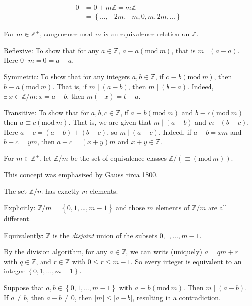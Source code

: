 \documentclass{notes}
\begin{document}
\begin{eg}
  \begin{align*}
    \overline 0 &= 0 + m \mathbb Z = m \mathbb Z \\ 
    &= \left \{ \dots, -2 m, -m, 0, m, 2 m, \dots \right \}
  \end{align*}
\end{eg}

\begin{prop}
  For $m \in \mathbb Z^+$, congruence mod $m$ is an equivalence relation on $\mathbb Z$.
\end{prop}

\begin{prf}
  Reflexive: To show that for any $a \in \mathbb Z$, $a \equiv a (\mathrm{mod}\ m)$, that is $m \mid (a - a)$.
  Here $0 \cdot m = 0 = a - a$.

  Symmetric: To show that for any integers $a, b \in \mathbb Z$, if $a \equiv b (\mathrm{mod}\ m)$, then $b \equiv a (\mathrm{mod}\ m)$.
  That is, if $m \mid (a - b)$, then $m \mid (b - a)$.
  Indeed, $\exists \, x \in \mathbb Z / m: x = a - b$, then $m (-x) = b - a$.

  Transitive: To show that for $a, b, c \in \mathbb Z$, if $a \equiv b (\mathrm{mod}\ m)$ and $b \equiv c (\mathrm{mod}\ m)$ then $a \equiv c (\mathrm{mod}\ m)$.
  That is, we are given that $m \mid (a - b)$ and $m \mid (b - c)$.
  Here $a - c = (a - b) + (b - c)$, so $m \mid (a - c)$.
  Indeed, if $a - b = x m$ and $b - c = y m$, then $a - c = (x + y) m$ and $x + y \in \mathbb Z$.
\end{prf}

\begin{defn}
  For $m \in \mathbb Z^+$, let $\mathbb Z / m$ be the set of equivalence classes $\mathbb Z / (\equiv (\mathrm{mod}\ m))$.

  This concept was emphasized by Gauss circa 1800.
\end{defn}

\begin{prop}
  The set $\mathbb Z / m$ has exactly $m$ elements.

  Explicitly: $\mathbb Z / m = \left \{ \overline 0, \overline 1, \dots, \overline{m - 1} \right \}$ and those $m$ elements of $\mathbb Z / m$ are all different.

  Equivalently: $\mathbb Z$ is the \textit{disjoint} union of the subsets $\overline 0, \overline 1, \dots, \overline{m - 1}$.
\end{prop}

\begin{prf}
  By the division algorithm, for any $a \in \mathbb Z$, we can write (uniquely) $a = q m + r$ with $q \in \mathbb Z$, and $r \in \mathbb Z$ with $0 \leq r \leq m - 1$.
  So every integer is equivalent to an integer $\left \{ 0, 1, \dots, m - 1 \right \}$.

  Suppose that $a, b \in \left \{ 0, 1, \dots, m - 1 \right \}$ with $a \equiv b (\mathrm{mod}\ m)$.
  Then $m \mid (a - b)$.
  If $a \neq b$, then $a - b \neq 0$, then $\left | m \right | \leq \left | a - b \right |$, resulting in a contradiction.
\end{prf}
\end{document}
